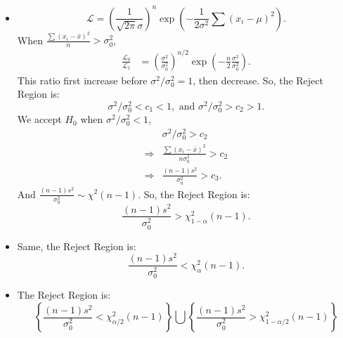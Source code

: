\begin{solution}
    \begin{itemize}
        \item \[
            \mathcal{L}=\left(\frac{1}{\sqrt{2\pi}\sigma}\right)^n \exp\left(-\frac{1}{2\sigma^2}\sum\left(x_i-\mu\right)^2\right). 
        \]
        When $\frac{\sum(x_i-\bar{x})^2}{n}>\sigma_0^2$, 
        \begin{align*}
            \frac{\mathcal{L}_0}{\mathcal{L}_1}&=\left(\frac{\sigma^2}{\sigma_0^2}\right)^{n/2}\exp\left(-\frac{n}{2}\frac{\sigma^2}{\sigma_0^2}\right). 
        \end{align*}
        This ratio first increase before $\sigma^2/\sigma_0^2=1$, then decrease. So, the Reject Region is: 
        \[
            \sigma^2/\sigma_0^2<c_1<1, \text{ and } \sigma^2/\sigma_0^2>c_2>1.
        \]
        We accept $H_0$ when $\sigma^2/\sigma_0^2<1$, 
        \[
            \begin{aligned}
                &\sigma^2/\sigma_0^2>c_2\\
                \Rightarrow &\frac{\sum(x_i-\bar{x})^2}{n\sigma_0^2}>c_2\\
                \Rightarrow &\frac{(n-1)s^2}{\sigma_0^2}>c_3. 
            \end{aligned}
        \]
        And $\frac{(n-1)s^2}{\sigma_0^2}\sim\chi^2(n-1)$. So, the Reject Region is:
        \[
            \frac{(n-1)s^2}{\sigma_0^2}>\chi^2_{1-\alpha}(n-1). 
        \]
        \item Same, the Reject Region is:
        \[
            \frac{(n-1)s^2}{\sigma_0^2}<\chi^2_{\alpha}(n-1). 
        \]
        \item The Reject Region is:
        \[
            \left\{\frac{(n-1)s^2}{\sigma_0^2}<\chi^2_{\alpha/2}(n-1)\right\}\bigcup\left\{\frac{(n-1)s^2}{\sigma_0^2}>\chi^2_{1-\alpha/2}(n-1)\right\}
        \]
    \end{itemize}
\end{solution}

